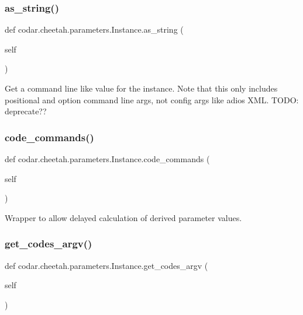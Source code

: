 \subsubsection{\texorpdfstring{as\+\_\+string()}{as\_string()}}
{\footnotesize\ttfamily def codar.\+cheetah.\+parameters.\+Instance.\+as\+\_\+string (\begin{DoxyParamCaption}\item[{}]{self }\end{DoxyParamCaption})}

\begin{DoxyVerb}Get a command line like value for the instance. Note that this
only includes positional and option command line args, not config
args like adios XML. TODO: deprecate??\end{DoxyVerb}
 \mbox{\label{classcodar_1_1cheetah_1_1parameters_1_1_instance_a417d9d44a5eb0e0b8812fc427ddc4435}} 
\subsubsection{\texorpdfstring{code\+\_\+commands()}{code\_commands()}}
{\footnotesize\ttfamily def codar.\+cheetah.\+parameters.\+Instance.\+code\+\_\+commands (\begin{DoxyParamCaption}\item[{}]{self }\end{DoxyParamCaption})}

\begin{DoxyVerb}Wrapper to allow delayed calculation of derived parameter values.\end{DoxyVerb}
 \mbox{\label{classcodar_1_1cheetah_1_1parameters_1_1_instance_a4ee126bbceeb792914185ca9fbe59101}} 
\subsubsection{\texorpdfstring{get\+\_\+codes\+\_\+argv()}{get\_codes\_argv()}}
{\footnotesize\ttfamily def codar.\+cheetah.\+parameters.\+Instance.\+get\+\_\+codes\+\_\+argv (\begin{DoxyParamCaption}\item[{}]{self }\end{DoxyParamCaption})}

